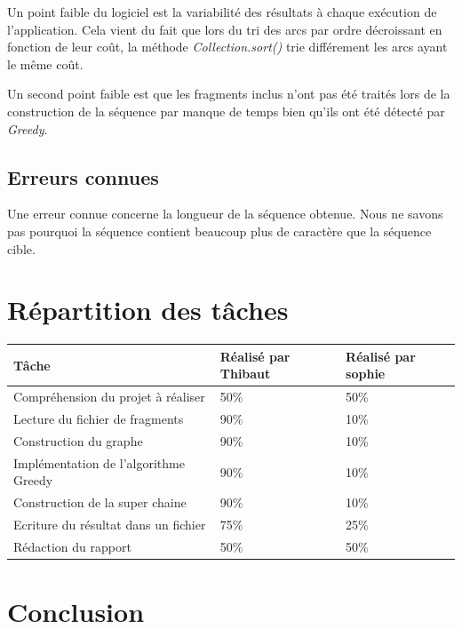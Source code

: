 \documentclass[12pt,a4paper,final]{article}
\begin{document}
Un point faible du logiciel est la variabilité des résultats à chaque exécution de l'application.  Cela vient du fait que lors du tri des arcs par ordre décroissant en fonction de leur coût, la méthode \textit{Collection.sort()} trie différement les arcs ayant le même coût.\medskip


Un second point faible est que les fragments inclus n'ont pas été traités lors de la construction de la séquence par manque de temps bien qu'ils ont été détecté par \textit{Greedy}.

\subsection{Erreurs connues}

Une erreur connue concerne la longueur de la séquence obtenue.  Nous ne savons pas pourquoi la séquence contient beaucoup plus de caractère que la séquence cible.

\newpage
\section{Répartition des tâches}

\begin{table}[!ht]
\centering
\begin{tabular}{|l|l|l|}
	\hline
	Tâche & Réalisé par Thibaut & Réalisé par sophie\\
	\hline
	Compréhension du projet à réaliser & 50\% & 50\% \\
	Lecture du fichier de fragments & 90\% & 10\% \\
	Construction du graphe & 90\% & 10\% \\
	Implémentation de l'algorithme Greedy  & 90\% & 10\% \\
	Construction de la super chaine  & 90\% & 10\% \\
	Ecriture du résultat dans un fichier & 75\% & 25\% \\
	Rédaction du rapport  & 50\% & 50\% \\ %
\end{tabular}
\end{table}

\newpage
\section{Conclusion} 



\end{document}
